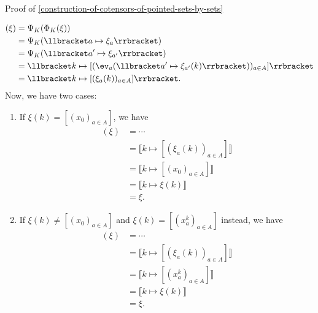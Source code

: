 \begin{Proof}{Proof of \cref{construction-of-cotensors-of-pointed-sets-by-sets}}
\begin{itemize}
\begin{align*}
                [\Psi_{K}\circ\Phi_{K}](\xi) &= \Psi_{K}(\Phi_{K}(\xi))\\%
                                             &= \Psi_{K}(\llbracket a\mapsto\xi_{a}\rrbracket)\\%
                                             &= \Psi_{K}(\llbracket a'\mapsto\xi_{a'}\rrbracket)\\%
                                             &= \llbracket k\mapsto[(\ev_{a}(\llbracket a'\mapsto\xi_{a'}(k)\rrbracket))_{a\in A}]\rrbracket\\%
                                             &= \llbracket k\mapsto[(\xi_{a}(k))_{a\in A}]\rrbracket.%
            \end{align*}
            Now, we have two cases:
            \begin{enumerate}
                \item If $\xi(k)=[(x_{0})_{a\in A}]$, we have
                    \begin{align*}
                        [\Psi_{K}\circ\Phi_{K}](\xi) &= \cdots\\%
                                                     &= \llbracket k\mapsto[(\xi_{a}(k))_{a\in A}]\rrbracket\\%
                                                     &= \llbracket k\mapsto[(x_{0})_{a\in A}]\rrbracket\\%
                                                     &= \llbracket k\mapsto\xi(k)\rrbracket\\%
                                                     &= \xi.%
                    \end{align*}
                \item If $\xi(k)\neq [(x_{0})_{a\in A}]$ and $\xi(k)=[(x^{k}_{a})_{a\in A}]$ instead, we have
                    \begin{align*}
                        [\Psi_{K}\circ\Phi_{K}](\xi) &= \cdots\\%
                                                     &= \llbracket k\mapsto[(\xi_{a}(k))_{a\in A}]\rrbracket\\%
                                                     &= \llbracket k\mapsto[(x^{k}_{a})_{a\in A}]\rrbracket\\%
                                                     &= \llbracket k\mapsto\xi(k)\rrbracket\\%
                                                     &= \xi.%
                    \end{align*}

\end{enumerate}
\end{itemize}
\end{Proof}
